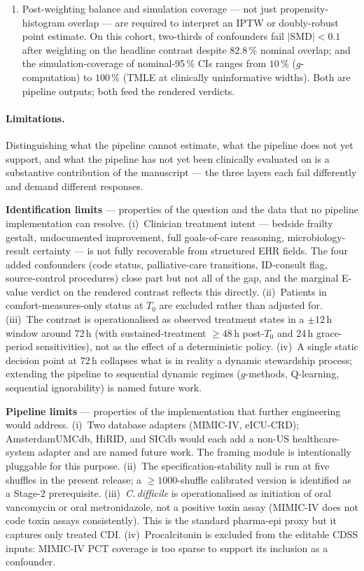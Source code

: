 \documentclass[11pt,a4paper]{article}
\begin{document}
\begin{enumerate}[leftmargin=*,itemsep=2pt]
\item Post-weighting balance and simulation coverage --- not just propensity-histogram overlap --- are required to interpret an IPTW or doubly-robust point estimate. On this cohort, two-thirds of confounders fail $|$SMD$|<0.1$ after weighting on the headline contrast despite $82.8\,\%$ nominal overlap; and the simulation-coverage of nominal-95\,\% CIs ranges from $10\,\%$ ($g$-computation) to $100\,\%$ (TMLE at clinically uninformative widths). Both are pipeline outputs; both feed the rendered verdicts.
\end{enumerate}

\paragraph{Limitations.} Distinguishing what the pipeline cannot estimate, what the pipeline does not yet support, and what the pipeline has not yet been clinically evaluated on is a substantive contribution of the manuscript --- the three layers each fail differently and demand different responses.

\textbf{Identification limits} --- properties of the question and the data that no pipeline implementation can resolve. (i)~Clinician treatment intent --- bedside frailty gestalt, undocumented improvement, full goals-of-care reasoning, microbiology-result certainty --- is not fully recoverable from structured EHR fields. The four added confounders (code status, palliative-care transitions, ID-consult flag, source-control procedures) close part but not all of the gap, and the marginal E-value verdict on the rendered contrast reflects this directly. (ii)~Patients in comfort-measures-only status at $T_0$ are excluded rather than adjusted for. (iii)~The contrast is operationalised as observed treatment states in a $\pm 12$\,h window around 72\,h (with sustained-treatment $\geq 48$\,h post-$T_0$ and 24\,h grace-period sensitivities), not as the effect of a deterministic policy. (iv)~A single static decision point at 72\,h collapses what is in reality a dynamic stewardship process; extending the pipeline to sequential dynamic regimes ($g$-methods, Q-learning, sequential ignorability) is named future work.

\textbf{Pipeline limits} --- properties of the implementation that further engineering would address. (i)~Two database adapters (MIMIC-IV, eICU-CRD); AmsterdamUMCdb, HiRID, and SICdb would each add a non-US healthcare-system adapter and are named future work. The framing module is intentionally pluggable for this purpose. (ii)~The specification-stability null is run at five shuffles in the present release; a $\geq 1000$-shuffle calibrated version is identified as a Stage-2 prerequisite. (iii)~\emph{C.\,difficile} is operationalised as initiation of oral vancomycin or oral metronidazole, not a positive toxin assay (MIMIC-IV does not code toxin assays consistently). This is the standard pharma-epi proxy \cite{bagdasarian2015diagnosis} but it captures only treated CDI. (iv)~Procalcitonin is excluded from the editable CDSS inputs: MIMIC-IV PCT coverage is too sparse to support its inclusion as a confounder.
\end{document}
